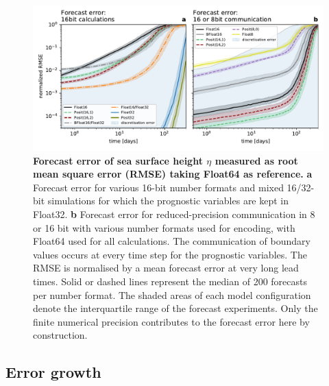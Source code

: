 \begin{figure}
\includegraphics[width=1\textwidth]{Figures/swm/rmse_eta_darker.pdf}
\caption{\textbf{Forecast error of sea surface height $\eta$ measured as root mean square error (RMSE) taking Float64 as reference.}
\textbf{a} Forecast error for various 16-bit number formats and mixed 16/32-bit simulations for which the prognostic variables
are kept in Float32. \textbf{b} Forecast error for reduced-precision communication in 8 or 16 bit with various number formats used
for encoding, with Float64 used for all calculations. The communication of boundary values occurs at every time step
for the prognostic variables. The RMSE is normalised by a mean forecast error at very long lead times. Solid or dashed lines represent
the median of 200 forecasts per number format. The shaded areas of each model configuration denote the interquartile
range of the forecast experiments. Only the finite numerical precision contributes to the forecast error here by construction.}
\label{fig:rmse}
\end{figure}

\subsection{Error growth}

